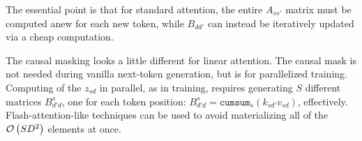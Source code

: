The essential point is that for standard attention, the entire $ A _{s s'} $ matrix must be computed
anew for each new token, while $ B _{ d d' } $ can instead be iteratively updated via a cheap
computation.

The causal masking looks a little different for linear attention. The causal mask is not needed
during vanilla next-token generation, but is for parallelized training. Computing of the $ z _{ sd }
$ in parallel, as in training, requires generating $ S $ different matrices $ B ^{ s }_{  d'd }  $,
one for each token position: $ B ^{ s }_{  d' d } = \texttt{cumsum}_{ s } \left ( k _{ sd' }v _{ sd
} \right ) $, effectively. Flash-attention-like techniques can be used to avoid materializing all of
the $ \mathcal{O} \left( SD ^{ 2 } \right)  $ elements at once.


